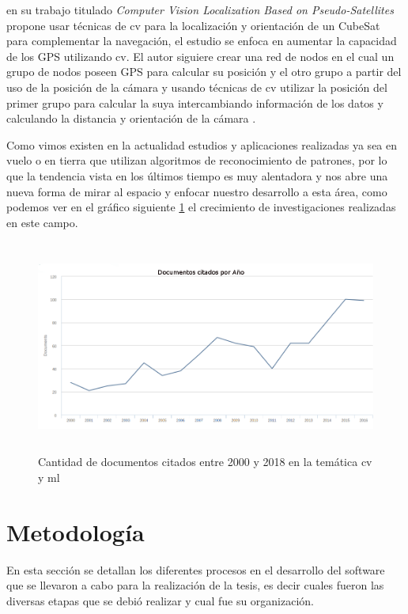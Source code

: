 \cite{Huggins} en su trabajo titulado \textit{Computer Vision Localization Based on Pseudo-Satellites} propone usar técnicas de \ac{cv} para la localización y orientación de un CubeSat para complementar la navegación, el estudio se enfoca en  aumentar la capacidad de los GPS utilizando \ac{cv}. El autor siguiere crear una red de nodos en el cual un grupo de nodos poseen GPS para calcular su posición y el otro grupo a partir del uso de la posición de la cámara y usando técnicas de  \ac{cv}  utilizar la posición del primer grupo para calcular la suya intercambiando información de los datos y calculando la distancia y orientación de la cámara \citep{Huggins}.

Como vimos existen en la actualidad estudios y aplicaciones realizadas ya sea en vuelo o en tierra que utilizan algoritmos de reconocimiento de patrones, por lo que la tendencia vista en los últimos tiempo es muy alentadora y nos abre una nueva forma de mirar al espacio y enfocar nuestro desarrollo a esta área, como podemos ver en el gráfico siguiente \ref{Fig: scopus1} el crecimiento de investigaciones realizadas en este campo. 

\begin{figure}[h]
 \centering
  \includegraphics[height=7cm,keepaspectratio=true,clip=true]{imagenes/Logos/scopus.png}
  \caption{Cantidad de documentos citados entre 2000 y 2018 en la temática \ac{cv} y \ac{ml}}
	\label{Fig: scopus1}
\end{figure}



\section{Metodología}\label{sec:metodologia}
En esta sección se detallan los diferentes procesos en el desarrollo del software que se llevaron a cabo para la realización de la tesis, es decir cuales fueron las diversas etapas que se debió realizar y cual fue su organización.

